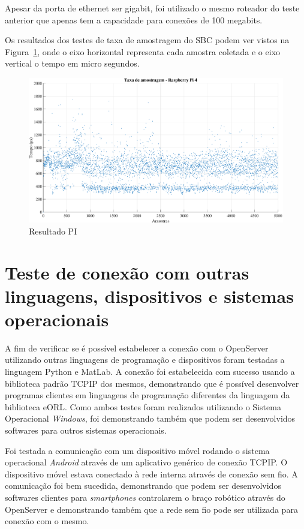         Apesar da porta de ethernet ser gigabit, foi utilizado o mesmo roteador do teste anterior que apenas tem a capacidade para conexões de 100 megabits.
        
        Os resultados dos testes de taxa de amostragem do \ac{SBC} podem ver vistos na Figura~\ref{fig:resultado_PI}, onde o eixo horizontal representa cada amostra coletada e o eixo vertical o tempo em micro segundos.
        
        \begin{figure}[h]
            \centering
            \includegraphics[width=\columnwidth]{imagens/Resultados/testePi.eps}
            \small 
            \centering 
            \caption{Resultado PI}
            \label{fig:resultado_PI}
        \end{figure}
        
    \section{Teste de conexão com outras linguagens, dispositivos e sistemas operacionais}
    
       A fim de verificar se é possível estabelecer a conexão com o OpenServer utilizando outras linguagens de programação e dispositivos foram testadas a linguagem Python e MatLab. A conexão foi estabelecida com sucesso usando a biblioteca padrão \ac{TCPIP} dos mesmos, demonstrando que é possível desenvolver programas clientes em linguagens de programação diferentes da linguagem da biblioteca \ac{eORL}. Como ambos testes foram realizados utilizando o Sistema Operacional \textit{Windows}, foi demonstrando também que podem ser desenvolvidos softwares para outros sistemas operacionais.
       
       Foi testada a comunicação com um dispositivo móvel rodando o sistema operacional \textit{Android} através de um aplicativo genérico de conexão \ac{TCPIP}. O dispositivo móvel estava conectado à rede interna através de conexão sem fio. A comunicação foi bem sucedida, demonstrando que podem ser desenvolvidos softwares clientes para \textit{smartphones} controlarem o braço robótico através do OpenServer e demonstrando também que a rede sem fio pode ser utilizada para conexão com o mesmo.
    
